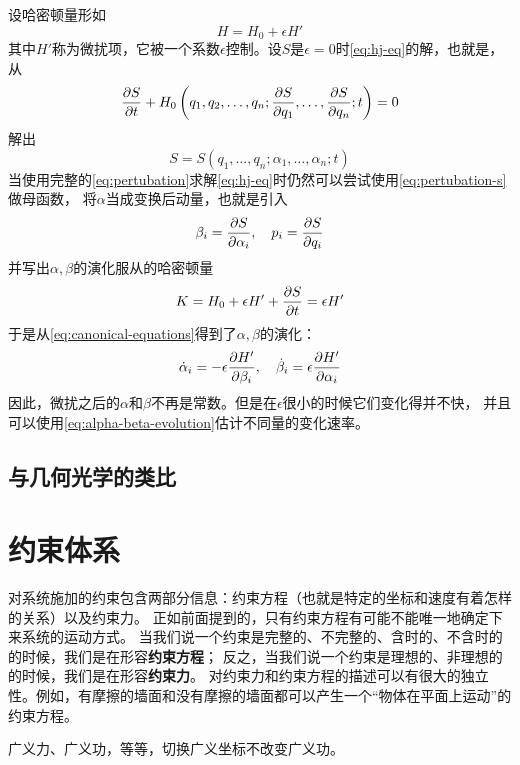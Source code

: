 \documentclass[UTF8, a4paper]{ctexart}
\begin{document}
设哈密顿量形如
\begin{equation}
    H = H_0 + \epsilon H'
    \label{eq:pertubation}
\end{equation}
其中$H'$称为微扰项，它被一个系数$\epsilon$控制。设$S$是$\epsilon=0$时\eqref{eq:hj-eq}的解，也就是，从
\begin{equation}
    \pdv{S}{t} + H_0 \left(q_1, q_2, \ldots, q_n ; \pdv{S}{q_1}, \ldots, \pdv{S}{q_n}; t\right) = 0
    \label{eq:pertubation-s-eq}
\end{equation}
解出
\begin{equation}
    S = S(q_1, \ldots, q_n; \alpha_1, \ldots, \alpha_n; t)
    \label{eq:pertubation-s}
\end{equation}
当使用完整的\eqref{eq:pertubation}求解\eqref{eq:hj-eq}时仍然可以尝试使用\eqref{eq:pertubation-s}做母函数，
将$\alpha$当成变换后动量，也就是引入
\[
    \beta_i = \pdv{S}{\alpha_i}, \quad p_i = \pdv{S}{q_i}
\]
并写出$\alpha, \beta$的演化服从的哈密顿量
\[
    K = H_0 + \epsilon H' + \pdv{S}{t} = \epsilon H'
\]
于是从\eqref{eq:canonical-equations}得到了$\alpha, \beta$的演化：
\begin{equation}
    \dot{\alpha}_i = - \epsilon \pdv{H'}{\beta_i}, \quad \dot{\beta}_i = \epsilon \pdv{H'}{\alpha_i}
    \label{eq:alpha-beta-evolution}
\end{equation}
因此，微扰之后的$\alpha$和$\beta$不再是常数。但是在$\epsilon$很小的时候它们变化得并不快，
并且可以使用\eqref{eq:alpha-beta-evolution}估计不同量的变化速率。

\subsection{与几何光学的类比}



\section{约束体系}
\label{sec:constraints}

对系统施加的约束包含两部分信息：约束方程（也就是特定的坐标和速度有着怎样的关系）以及约束力。
正如前面提到的，只有约束方程有可能不能唯一地确定下来系统的运动方式。
当我们说一个约束是完整的、不完整的、含时的、不含时的的时候，我们是在形容\textbf{约束方程}；
反之，当我们说一个约束是理想的、非理想的的时候，我们是在形容\textbf{约束力}。
对约束力和约束方程的描述可以有很大的独立性。例如，有摩擦的墙面和没有摩擦的墙面都可以产生一个“物体在平面上运动”的约束方程。

广义力、广义功，等等，切换广义坐标不改变广义功。
\end{document}
